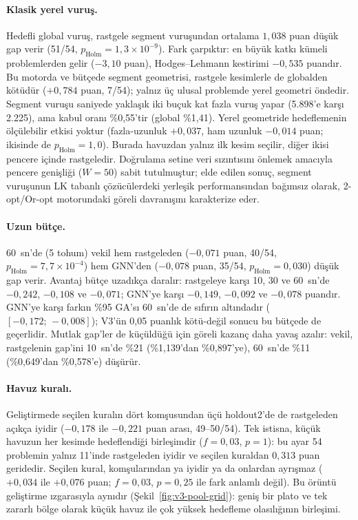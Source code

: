 \paragraph{Klasik yerel vuruş.}
Hedefli global vuruş, rastgele segment vuruşundan ortalama $1{,}038$ puan düşük gap verir (51/54,
$p_{\mathrm{Holm}}=1{,}3\times10^{-9}$). Fark çarpıktır: en büyük katkı kümeli problemlerden gelir
($-3{,}10$ puan), Hodges--Lehmann kestirimi $-0{,}535$ puandır.
Bu motorda ve bütçede segment geometrisi, rastgele kesimlerle de globalden kötüdür ($+0{,}784$ puan,
7/54); yalnız üç ulusal problemde yerel geometri öndedir.
Segment vuruşu saniyede yaklaşık iki buçuk kat fazla vuruş yapar (5.898'e karşı 2.225), ama kabul
oranı \%0,55'tir (global \%1,41).
Yerel geometride hedeflemenin ölçülebilir etkisi yoktur (fazla-uzunluk $+0{,}037$, ham uzunluk
$-0{,}014$ puan; ikisinde de $p_{\mathrm{Holm}}=1{,}0$). Burada havuzdan yalnız ilk kesim seçilir,
diğer ikisi pencere içinde rastgeledir.
Doğrulama setine veri sızıntısını önlemek amacıyla pencere genişliği ($W=50$) sabit tutulmuştur;
elde edilen sonuç, segment vuruşunun LK tabanlı çözücülerdeki yerleşik performansından
\citep{applegate_2003_clk} bağımsız olarak, 2-opt/Or-opt motorundaki göreli davranışını karakterize eder.

\paragraph{Uzun bütçe.}
60~sn'de (5 tohum) vekil hem rastgeleden ($-0{,}071$ puan, 40/54, $p_{\mathrm{Holm}}=7{,}7\times10^{-4}$)
hem GNN'den ($-0{,}078$ puan, 35/54, $p_{\mathrm{Holm}}=0{,}030$) düşük gap verir.
Avantaj bütçe uzadıkça daralır: rastgeleye karşı 10, 30 ve 60~sn'de $-0{,}242$, $-0{,}108$ ve
$-0{,}071$; GNN'ye karşı $-0{,}149$, $-0{,}092$ ve $-0{,}078$ puandır.
GNN'ye karşı farkın \%95 GA'sı 60~sn'de de sıfırın altındadır ($[-0{,}172;\,-0{,}008]$); V3'ün
0,05 puanlık kötü-değil sonucu bu bütçede de geçerlidir.
Mutlak gap'ler de küçüldüğü için göreli kazanç daha yavaş azalır: vekil, rastgelenin gap'ini 10~sn'de
\%21 (\%1,139'dan \%0,897'ye), 60~sn'de \%11 (\%0,649'dan \%0,578'e) düşürür.

\paragraph{Havuz kuralı.}
Geliştirmede seçilen kuralın dört komşusundan üçü holdout2'de de rastgeleden açıkça iyidir
($-0{,}178$ ile $-0{,}221$ puan arası, 49--50/54).
Tek istisna, küçük havuzun her kesimde hedeflendiği birleşimdir ($f=0{,}03$, $p=1$): bu ayar
54 problemin yalnız 11'inde rastgeleden iyidir ve seçilen kuraldan $0{,}313$ puan geridedir.
Seçilen kural, komşularından ya iyidir ya da onlardan ayrışmaz ($+0{,}034$ ile $+0{,}076$ puan;
$f=0{,}03$, $p=0{,}25$ ile fark anlamlı değil).
Bu örüntü geliştirme ızgarasıyla aynıdır (Şekil~\ref{fig:v3-pool-grid}): geniş bir plato ve tek
zararlı bölge olarak küçük havuz ile çok yüksek hedefleme olasılığının birleşimi.

